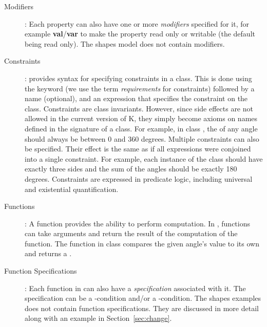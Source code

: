 \begin{description}
\item [Modifiers]: Each property can also have one or more
  {\em modifiers} specified for it, for example
  {\bf val}/{\bf var} to make the property read only or writable (the default being
    read only). The shapes model does not contain modifiers.
  
\item [Constraints]: \Klang{} provides syntax for specifying
  constraints in a class. This is done using the  keyword
  (we use the term {\em requirements} for constraints) followed by a
  name (optional), and an expression that specifies the constraint on
  the class. Constraints are class invariants. However, since side
  effects are not allowed in the current version of K, they simply
  become axioms on names defined in the signature of a class. For
  example, in class , the  of any angle should
  always be between 0 and 360 degrees. Multiple constraints can also
  be specified. Their effect is the same as if all expressions were
  conjoined into a single constraint. For example, each instance of
  the  class should have exactly three sides and the
  sum of the angles should be exactly 180 degrees. Constraints are
  expressed in predicate logic, including universal and existential
  quantification.
  
\item [Functions]: A function provides the ability to perform
  computation. In \Klang{}, functions can take arguments and return
  the result of the computation of the function. The 
  function in class  compares the given angle's value to
  its own and returns a .

\item [Function Specifications]: Each function in \Klang{} can also
  have a \emph{specification} associated with it. The specification
  can be a -condition and/or a
  -condition. The shapes examples does not contain function
  specifications. They are discussed in more detail along with
  an example in Section~\ref{sec:change}.
  

\end{description}
